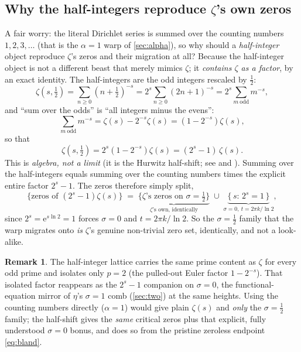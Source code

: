 \documentclass[11pt]{article}
\theoremstyle{definition}
\newtheorem{remark}{Remark}
\newcommand{\eu}{\mathrm{e}}
\begin{document}
\subsection{Why the half-integers reproduce $\zeta$'s own zeros}\label{sec:legit}

A fair worry: the literal Dirichlet series is summed over the counting numbers
$1,2,3,\dots$ (that is the $\alpha=1$ warp of \cref{sec:alpha}), so why should a
\emph{half-integer} object reproduce $\zeta$'s zeros and their migration at all?
Because the half-integer object is not a different beast that merely mimics
$\zeta$; it \emph{contains $\zeta$ as a factor}, by an exact identity. The
half-integers are the odd integers rescaled by $\tfrac12$:
\begin{equation}\label{eq:oddsum}
  \zeta(s,\tfrac12) = \sum_{n\ge 0}(n+\tfrac12)^{-s}
  = 2^{s}\sum_{n\ge 0}(2n+1)^{-s}
  = 2^{s}\!\!\sum_{m\ \mathrm{odd}}\! m^{-s},
\end{equation}
and ``sum over the odds'' is ``all integers minus the evens'':
\begin{equation}\label{eq:oddszeta}
  \sum_{m\ \mathrm{odd}} m^{-s} = \zeta(s) - 2^{-s}\zeta(s) = (1-2^{-s})\zeta(s),
\end{equation}
so that
\begin{equation}\label{eq:halfshift}
  \boxed{\;\zeta(s,\tfrac12) = 2^{s}(1-2^{-s})\zeta(s) = (2^{s}-1)\,\zeta(s).\;}
\end{equation}
This is \emph{algebra, not a limit} (it is the Hurwitz half-shift; see
\citealp{Gonek1981,GarunkstisSteuding2007} and \citealp[\S25.11]{DLMF}). Summing over the
half-integers equals summing over the counting numbers times the explicit entire
factor $2^{s}-1$. The zeros therefore simply split,
\begin{equation}\label{eq:zerosplit}
  \{\text{zeros of } (2^{s}-1)\zeta(s)\}
  \;=\;
  \underbrace{\{\zeta\text{'s zeros on }\sigma=\tfrac12\}}_{\text{$\zeta$'s own, identically}}
  \;\cup\;
  \underbrace{\{\,s:\,2^{s}=1\,\}}_{\sigma=0,\ t=2\pi k/\ln 2},
\end{equation}
since $2^{s}=\eu^{s\ln 2}=1$ forces $\sigma=0$ and $t=2\pi k/\ln 2$. So the
$\sigma=\tfrac12$ family that the warp migrates onto \emph{is} $\zeta$'s genuine
non-trivial zero set, identically, and not a look-alike.

\begin{remark}
The half-integer lattice carries the same prime content as $\zeta$ for every odd
prime and isolates only $p=2$ (the pulled-out Euler factor $1-2^{-s}$). That
isolated factor reappears as the $2^{s}-1$ companion on $\sigma=0$, the
functional-equation mirror of $\eta$'s $\sigma=1$ comb (\cref{sec:two}) at the
same heights. Using the counting numbers directly ($\alpha=1$) would give plain
$\zeta(s)$ and \emph{only} the $\sigma=\tfrac12$ family; the half-shift gives the
\emph{same} critical zeros plus that explicit, fully understood $\sigma=0$ bonus,
and does so from the pristine zeroless endpoint \eqref{eq:bland}.
\end{remark}
\end{document}

